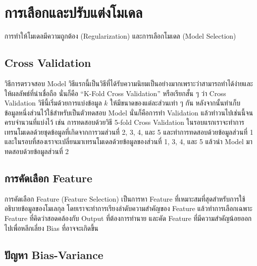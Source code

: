 

\chapter{การเลือกและปรับแต่งโมเดล}
\label{ch:reg_sel_model}

การทำให้โมเดลมีความถูกต้อง (Regularization) และการเลือกโมเดล (Model Selection)

\section{Cross Validation}

วิธีการตรวจสอบ Model วิธีแรกนี้เป็นวิธีที่ได้รับความนิยมเป็นอย่างมากเพราะว่าสามารถทำได้ง่ายและให้ผลลัพธ์ที่น่าเชื่อถือ นั่นก็คือ \enquote{K-Fold Cross Validation}
หรือเรียกสั้น ๆ ว่า Cross Validation วิธีนี้เริ่มด้วยการแบ่งข้อมูล $k$ ให้มีขนาดของแต่ละส่วนเท่า ๆ กัน หลังจากนั้นทำเก็บข้อมูลหนึ่งส่วนไว้ใช้สำหรับเป็นตัวทดสอบ Model 
นั่นก็คือการทำ Validation แล้วทําวนไปเช่นนี้จนครบจํานวนที่แบ่งไว้ เช่น การทดสอบด้วยวิธี 5-fold Cross Validation
ในรอบแรกเราจะทำการเทรนโมเดลด้วยชุดข้อมูลที่เกิดจากการวมส่วนที่ 2, 3, 4, และ 5 และทำการทดสอบด้วยข้อมูลส่วนที่ 1 
และในรอบที่สองเราจะเปลี่ยนมาเทรนโมเดลด้วยข้อมูลของส่วนที่ 1, 3, 4, และ 5 แล้วนำ Model มาทดสอบด้วยข้อมูลส่วนที่ 2

\section{การคัดเลือก Feature}

การคัดเลือก Feature (Feature Selection) เป็นการหา Feature ที่เหมาะสมที่สุดสำหรับการใช้อธิบายข้อมูลของโมเลกุล โดยเราจะทำการเรียงลำดับความสำคัญของ Feature 
แล้วทำการเลือกเฉพาะ Feature ที่คิดว่าสอดคล้องกับ Output ที่ต้องการทำนาย และคัด Feature ที่มีความสำคัญน้อยออกไปเพื่อหลีกเลี่ยง Bias ที่อาจจะเกิดขึ้น

\section{ปัญหา Bias-Variance}

